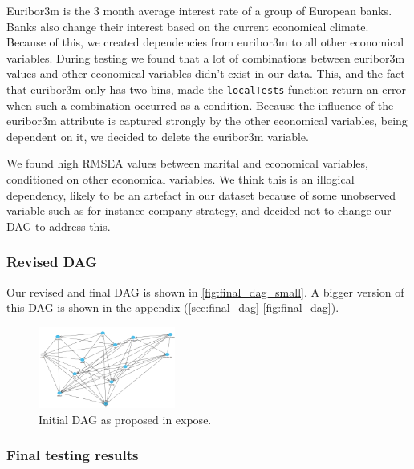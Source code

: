 \documentclass[11pt,]{article}
\begin{document}
\begin{multicols}{2}
\bigskip

Euribor3m is the 3 month average interest rate of a group of European
banks. Banks also change their interest based on the current economical
climate. Because of this, we created dependencies from euribor3m to all
other economical variables. During testing we found that a lot of
combinations between euribor3m values and other economical variables
didn't exist in our data. This, and the fact that euribor3m only has two
bins, made the \texttt{localTests} function return an error when such a
combination occurred as a condition. Because the influence of the
euribor3m attribute is captured strongly by the other economical
variables, being dependent on it, we decided to delete the euribor3m
variable.

We found high RMSEA values between marital and economical variables,
conditioned on other economical variables. We think this is an illogical
dependency, likely to be an artefact in our dataset because of some
unobserved variable such as for instance company strategy, and decided
not to change our DAG to address this.

\hypertarget{revised-dag}{%
\subsubsection{Revised DAG}\label{revised-dag}}

Our revised and final DAG is shown in \autoref{fig:final_dag_small}. A
bigger version of this DAG is shown in the appendix
(\autoref{sec:final_dag} \autoref{fig:final_dag}).

\begin{figure}[H]
    \centering
    \includegraphics[width=0.4\textwidth]{images/final_dag}
    \caption{Initial DAG as proposed in expose.}
    \label{fig:final_dag_small}
\end{figure}

\hypertarget{final-testing-results}{%
\subsubsection{Final testing results}\label{final-testing-results}}


\end{multicols}
\end{document}
